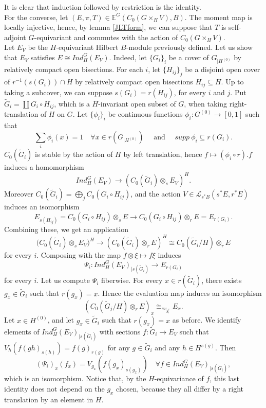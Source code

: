 \begin{dem} It is clear that induction followed by restriction is the identity.\\ 

For the converse, let $(E,\pi,T)\in \mathbb E^G(C_0(G\times_H V),B)$. The moment map is locally injective, hence, by lemma \ref{JLTform}, we can suppose that $T$ is self-adjoint $G$-equivariant and commutes with the action of $C_0(G\times_H V)$.\\

Let $E_V$ be the $H$-equivariant Hilbert $B$-module previously defined. Let us show that $E_{V}$ satisfies $E\cong Ind_H^G (E_V)$. Indeed, let $\{G_i\}_i$ be a cover of $G_{|H^{(0)}}$ by relatively compact open bisections. For each $i$, let $\{H_{ij}\}_j$ be a disjoint open cover of $r^{-1}( s(G_i))\cap H$ by relatively compact open bisections $H_{ij} \subseteq H$. Up to taking a subcover, we can suppose $s(G_i) = r(H_{ij})$, for every $i$ and $j$. Put $\tilde G_i = \coprod G_i \circ H_{ij}$, which is a $H$-invariant open subset of $G$, when taking right-translation of $H$ on $G$. Let $\{\phi_i\}_i$ be continuous functions $\phi_i : G^{(0)}\rightarrow [0,1]$ such that 
\[\sum_{i} \phi_i(x) = 1\quad \forall x\in r(G_{|H^{(0)}}) \quad \text{ and } \quad supp \ \phi_i\subseteq r(G_i) .\]
$C_0(\tilde G_i)$ is stable by the action of $H$ by left translation, hence $f\mapsto (\phi_i\circ r) . f$ induces a homomorphism 
\[Ind_H^G(E_V) \rightarrow \left( C_0(\tilde G_i)\otimes_s E_V\right)^H .\]  
Moreover $C_0(\tilde G_i) = \bigoplus_j C_0(G_i\circ H_{ij})$, and the action $V\in \mathcal L_{s^*B}(s^* E, r^* E)$ induces an isomorphism
\[ E_{s(H_{ij})}=C_0(G_i\circ H_{ij})\otimes_s E \rightarrow C_0(G_i\circ H_{ij})\otimes_r E = E_{r(G_{i})}. \]
Combining these, we get an application 
\[ \Big(C_0(\tilde G_i)\otimes_s E_V\Big)^H \rightarrow (C_0(\tilde G_i)\otimes_r E)^H \cong C_0(\tilde G_i/H)\otimes_r E \]
for every $i$. Composing with the map $f\otimes \xi \mapsto f\xi$ induces
\[\Psi_i : Ind_H^G(E_V)_{|s(\tilde G_i)} \rightarrow E_{r(G_i)}\]
for every $i$. 
Let us compute $\Psi_i$ fiberwise. For every $x\in r(\tilde G_i)$, there exists $g_x\in \tilde G_i$ such that $r(g_x)=x$. Hence the evaluation map induces an isomorphism 
\[\left( C_0(\tilde G_j / H) \otimes_r E \right)_x \cong_{ev_{g_i^x}} E_x.\] 
Let $x\in H^{(0)}$, and let $g_x \in \tilde G_i$ such that $r(g_x) = x$ as before. We identify elements of $Ind_H^G(E_V)_{|s(\tilde G_i)}$ with sections $f : \tilde G_i \rightarrow E_V$ such that $V_h(f(gh)_{s(h)})= f(g)_{r(g)}$ for any $g\in \tilde G_i$ and any $h\in H^{s(g)}$. Then 
\[ (\Psi_i)_x(f_x) = V_{g_x}\left( f(g_{x})_{s(g_x)} \right)\quad \forall f\in Ind_H^G(E_V)_{|s(\tilde G_i)}, \]
which is an isomorphism. Notice that, by the $H$-equivariance of $f$, this last identity does not depend on the $g_x$ chosen, because they all differ by a right translation by an element in $H$. \\


\end{dem}
